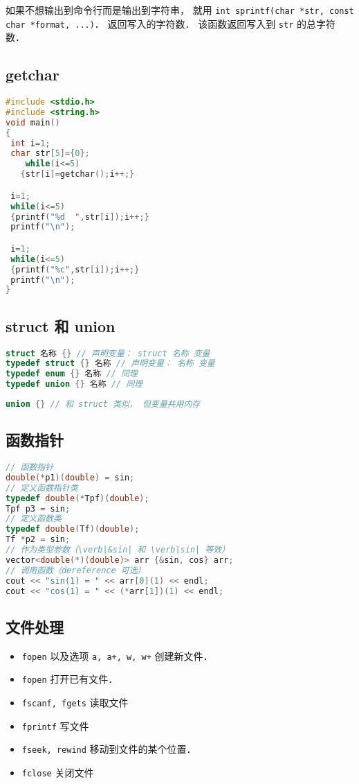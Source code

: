 如果不想输出到命令行而是输出到字符串， 就用 \verb|int sprintf(char *str, const char *format, ...)|． 返回写入的字符数． 该函数返回写入到 \verb|str| 的总字符数．

\subsection{getchar}
\begin{lstlisting}[language=cpp]
#include <stdio.h>
#include <string.h>
void main()
{
 int i=1;
 char str[5]={0};
    while(i<=5)
   {str[i]=getchar();i++;}

 i=1;
 while(i<=5)
 {printf("%d  ",str[i]);i++;}
 printf("\n");

 i=1;
 while(i<=5)
 {printf("%c",str[i]);i++;}
 printf("\n");
}
\end{lstlisting}

\subsection{struct 和 union}

\begin{lstlisting}[language=cpp]
struct 名称 {} // 声明变量： struct 名称 变量
typedef struct {} 名称 // 声明变量： 名称 变量
typedef enum {} 名称 // 同理
typedef union {} 名称 // 同理
\end{lstlisting}

\begin{lstlisting}[language=cpp]
union {} // 和 struct 类似， 但变量共用内存
\end{lstlisting}

\subsection{函数指针}
\begin{lstlisting}[language=cpp]
// 函数指针
double(*p1)(double) = sin;
// 定义函数指针类
typedef double(*Tpf)(double);
Tpf p3 = sin;
// 定义函数类
typedef double(Tf)(double);
Tf *p2 = sin;
// 作为类型参数（\verb|&sin| 和 \verb|sin| 等效）
vector<double(*)(double)> arr {&sin, cos} arr;
// 调用函数（dereference 可选）
cout << "sin(1) = " << arr[0](1) << endl;
cout << "cos(1) = " << (*arr[1])(1) << endl;
\end{lstlisting}

\subsection{文件处理}
\begin{itemize}
\item \verb|fopen| 以及选项 \verb|a, a+, w, w+| 创建新文件．
\item \verb|fopen| 打开已有文件．
\item \verb|fscanf, fgets| 读取文件
\item \verb|fprintf| 写文件
\item \verb|fseek, rewind| 移动到文件的某个位置．
\item \verb|fclose| 关闭文件
\end{itemize}
